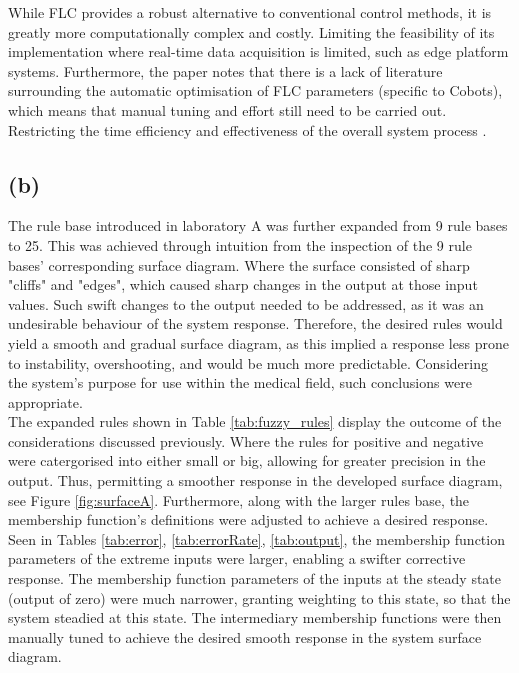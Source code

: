\documentclass[12pt]{article}
\begin{document}
While FLC provides a robust alternative to conventional control methods, it is greatly more computationally complex and costly.
Limiting the feasibility of its implementation where real-time data acquisition is limited, such as edge platform systems.
Furthermore, the paper notes that there is a lack of literature surrounding the automatic optimisation of FLC parameters (specific to Cobots), which means that manual tuning and effort still need to be carried out.
Restricting the time efficiency and effectiveness of the overall system process \cite{collab}. 

\subsection{(b)}

The rule base introduced in laboratory A was further expanded from 9 rule bases to 25. 
This was achieved through intuition from the inspection of the 9 rule bases' corresponding surface diagram. 
Where the surface consisted of sharp "cliffs" and "edges", which caused sharp changes in the output at those input values.
Such swift changes to the output needed to be addressed, as it was an undesirable behaviour of the system response.
Therefore, the desired rules would yield a smooth and gradual surface diagram, as this implied a response less prone to instability, overshooting, and would be much more predictable.
Considering the system's purpose for use within the medical field, such conclusions were appropriate. 
\\

The expanded rules shown in Table \ref{tab:fuzzy_rules} display the outcome of the considerations discussed previously.
Where the rules for positive and negative were catergorised into either small or big, allowing for greater precision in the output. 
Thus, permitting a smoother response in the developed surface diagram, see Figure \ref{fig:surfaceA}.
Furthermore, along with the larger rules base, the membership function's definitions were adjusted to achieve a desired response. 
Seen in Tables \ref{tab:error}, \ref{tab:errorRate}, \ref{tab:output}, the membership function parameters of the extreme inputs were larger, enabling a swifter corrective response.
The membership function parameters of the inputs at the steady state (output of zero) were much narrower, granting weighting to this state, so that the system steadied at this state. 
The intermediary membership functions were then manually tuned to achieve the desired smooth response in the system surface diagram.
\\
\end{document}
